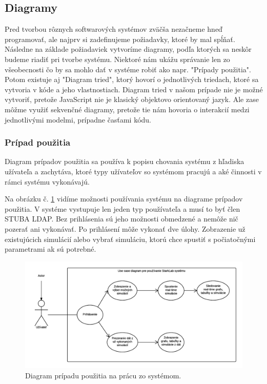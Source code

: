 \subsection{Diagramy}
Pred tvorbou rôznych softwarových systémov zväčša nezačneme hneď programovať, ale najprv si zadefinujeme požiadavky, ktoré by mal spĺňať. Následne na základe požiadaviek vytvoríme diagramy, podľa ktorých sa neskôr budeme riadiť pri tvorbe systému. Niektoré nám ukážu správanie len zo všeobecnosti čo by sa mohlo dať v systéme robiť ako napr. "Prípady použitia". Potom existuje aj "Diagram tried", ktorý hovorí o jednotlivých triedach, ktoré sa vytvoria v kóde a jeho vlastnostiach. Diagram tried v našom prípade nie je možné vytvoriť, pretože JavaScript nie je klasický objektovo orientovaný jazyk. Ale zase môžme využiť sekvenčné diagramy, pretože tie nám hovoria o interakcií medzi jednotlivými modelmi, prípadne časťami kódu.

\subsubsection{Prípad použitia}
Diagram prípadov použitia sa používa k popisu chovania systému z hľadiska užívateľa a zachytáva, ktoré typy užívateľov so systémom pracujú a aké činnosti v rámci systému vykonávajú.\cite{uml-usecase}

Na obrázku č. \ref{img-use-case} vidíme možnosti používania systému na diagrame prípadov použitia. V systéme vystupuje len jeden typ používateľa a musí to byť člen STUBA LDAP. Bez prihlásenia sú jeho možnosti obmedzené a nemôže nič pozerať ani vykonávať. Po prihlásení môže vykonať dve úlohy. Zobrazenie už existujúcich simulácií alebo vybrať simuláciu, ktorú chce spustiť s počiatočnými parametrami ak sú potrebné.

\begin{figure}[H]
  \centering
  \includegraphics[scale=0.7]{img/diagrams/use-case.png}
  \caption{Diagram prípadu použitia na prácu zo systémom.}
  \label{img-use-case}
\end{figure}

